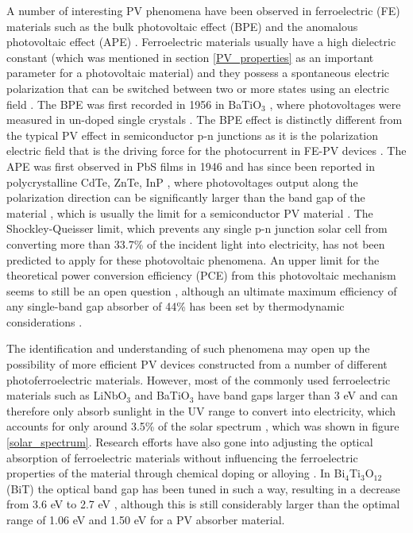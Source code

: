 A number of interesting PV phenomena have been observed in ferroelectric (FE) materials  such as the bulk photovoltaic effect (BPE) and the anomalous photovoltaic effect (APE) \cite{keith}. Ferroelectric materials usually have a high dielectric constant (which was mentioned in section \ref{PV_properties} as an important parameter for a photovoltaic material) and they possess a spontaneous electric polarization that can be switched between two or more states using an electric field \cite{new_FE_PV_1}.
The BPE was first recorded in 1956 in BaTiO$_3$ \cite{keith_46}, where photovoltages were measured in un-doped single crystals \cite{keith}.
The BPE effect is distinctly different from the typical PV effect in semiconductor
p-n junctions as it is the polarization electric field that is the driving force for the photocurrent in FE-PV devices \cite{FE_PV_rev1}. 
The APE was first observed in PbS films in 1946 \cite{keith_54} and has since been reported in polycrystalline CdTe, ZnTe, InP \cite{keith_55, keith_56, keith_57}, where photovoltages output along the polarization direction can be significantly larger than the band gap of the material \cite{FE_PV_rev1}, which is usually the limit for a semiconductor PV material \cite{keith}. 
The Shockley-Queisser limit, which prevents any single p-n junction solar cell from converting more than 33.7\% of the incident light into electricity, has not been predicted to apply for these photovoltaic phenomena. An upper limit for the theoretical power conversion efficiency (PCE) from this photovoltaic mechanism seems to still be an open question \cite{new_FE_PV}, although an ultimate maximum efficiency of any single-band gap absorber of 44\% has been set by thermodynamic considerations \cite{SQ_1961}. %

The identification and understanding of such phenomena may open up the possibility of more efficient PV devices constructed from a number of different photoferroelectric materials. However, most of the commonly used ferroelectric materials such as LiNbO$_3$ and BaTiO$_3$ have band gaps larger than 3 eV and can therefore only absorb sunlight in the UV range to convert into electricity, which accounts for only around 3.5\% of the solar spectrum \cite{FE_PV_rev1}, which was shown in figure \ref{solar_spectrum}. Research efforts have also gone into adjusting the optical absorption of ferroelectric materials without influencing the ferroelectric properties of the material through chemical doping or alloying \cite{FE_PV_rev1}. In Bi$_4$Ti$_3$O$_{12}$ (BiT) the optical band gap has been tuned in such a way, resulting in a decrease from 3.6 eV to 2.7 eV \cite{FE_PV_rev1_83}, although this is still considerably larger than the optimal range of 1.06 eV and 1.50 eV \cite{CZTS_book} for a PV absorber material.

